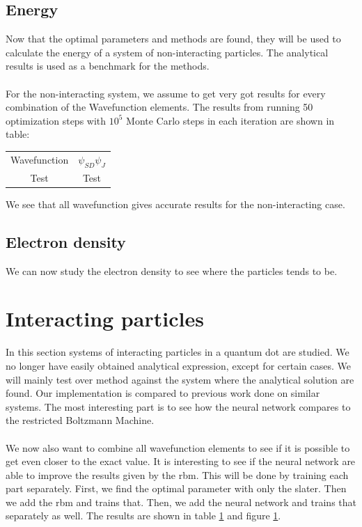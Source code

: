 \subsection{Energy}
Now that the optimal parameters and methods are found, they will be used to calculate the energy of a system of non-interacting particles. The analytical results is used as a benchmark for the methods.
\\
\\
For the non-interacting system, we assume to get very got results for every combination of the Wavefunction elements. The results from running 50 optimization steps with $10^5$ Monte Carlo steps in each iteration are shown in table:
\begin{table}[h!]
\centering
\begin{tabular}{c|c}
    Wavefunction & $\psi_{SD}\psi_{J}$  \\
    Test &  Test \\
\end{tabular}
\end{table}
We see that all wavefunction gives accurate results for the non-interacting case. 

\subsection{Electron density}
We can now study the electron density to see where the particles tends to be. 

\section{Interacting particles}
In this section systems of interacting particles in a quantum dot are studied. We no longer have easily obtained analytical expression, except for certain cases. We will mainly test over method against the system where the analytical solution are found. Our implementation is compared to previous work done on similar systems. The most interesting part is to see how the neural network compares to the restricted Boltzmann Machine. 
\\
\\
We now also want to combine all wavefunction elements to see if it is possible to get even closer to the exact value. It is interesting to see if the neural network are able to improve the results given by the rbm. This will be done by training each part separately. First, we find the optimal parameter with only the slater. Then we add the rbm and trains that. Then, we add the neural network and trains that separately as well. The results are shown in table \ref{} and figure \ref{}. 

\newpage